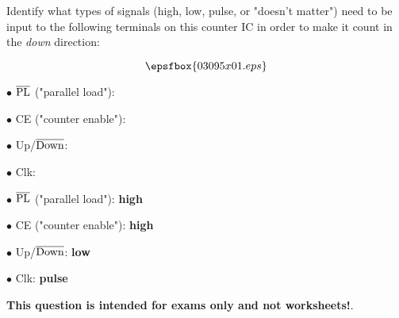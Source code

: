 

Identify what types of signals (high, low, pulse, or "doesn't matter") need to be input to the following terminals on this counter IC in order to make it count in the {\it down} direction:

$$\epsfbox{03095x01.eps}$$

\medskip
\item{$\bullet$} $\overline{\hbox{PL}}$ ("parallel load"):
\vskip 5pt
\item{$\bullet$} CE ("counter enable"):
\vskip 5pt
\item{$\bullet$} Up/$\overline{\hbox{Down}}$:
\vskip 5pt
\item{$\bullet$} Clk:
\medskip







\medskip
\item{$\bullet$} $\overline{\hbox{PL}}$ ("parallel load"): {\bf high}
\vskip 5pt
\item{$\bullet$} CE ("counter enable"): {\bf high}
\vskip 5pt
\item{$\bullet$} Up/$\overline{\hbox{Down}}$: {\bf low}
\vskip 5pt
\item{$\bullet$} Clk: {\bf pulse}
\medskip







{\bf This question is intended for exams only and not worksheets!}.




